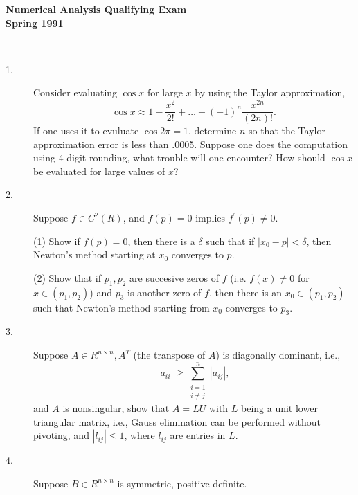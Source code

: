 \documentclass{article}
\begin{document}






\begin{center}\begin{LARGE}
{\bf Numerical Analysis Qualifying Exam}\\ 
{\bf Spring 1991}\\ \end{LARGE}
\end{center}
\vspace{0.1in}
\noindent\hrulefill\\

\begin{description}
\item[1.]
Consider evaluating $\cos x$ for large $x$ by using the Taylor approximation,
$$\cos x \approx 1 - \frac{x^2}{2!} + \dots + (-1)^n
  \frac{x^{2n}}{(2n)!}.$$
If one uses it to evuluate $\cos 2 \pi = 1$, determine $n$ so that the
Taylor approximation error is less than .0005. Suppose one does the
computation using 4-digit rounding, what trouble will one encounter? How
should $\cos x$ be evaluated for large values of $x$?

\item[2.]
Suppose $f \in C^2(R)$, and $f(p) = 0$ implies $f^\prime (p) \neq 0$.

\item[\quad] (1)
Show if $f(p)=0$, then there is a $\delta$ such that if $|x_0 - p| < \delta$,
then Newton's method starting at $x_0$ converges to $p$.

\item[\quad] (2)
Show that if $p_1, p_2$ are succesive zeros of $f$ (i.e. $f(x) \neq 0$ for
$x \in (p_1, p_2)$) and $p_3$ is another zero of $f$, then there is an
$x_0 \in (p_1, p_2)$ such that Newton's method starting from $x_0$ converges
to $p_3$.

\item[3.]
Suppose $A \in R^{n \times n}, A^T$ (the transpose of $A$) is diagonally
dominant, i.e.,
$$|a_{ii}| \geq \sum^n_{\substack{i =1 \\ i \neq j}} |a_{ij}|,$$
and $A$ is nonsingular, show that $A = LU$ with $L$ being a unit lower
triangular matrix, i.e., Gauss elimination can be performed without
pivoting, and $|l_{ij}|\leq 1$, where $l_{ij}$ are entries in $L$.

\item[4.]
Suppose $B \in R^{n \times n}$ is symmetric, positive definite.


\end{description}
\end{document}
